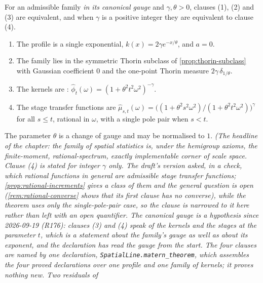 \begin{theorem}[the \Matern{} theorem]
For an admissible family \emph{in its canonical gauge} and $\gamma, \theta > 0$, clauses (1), (2)
and (3) are equivalent, and
when $\gamma$ is a positive integer they are equivalent to clause (4).
\begin{enumerate}
\item The profile is a single exponential, $k(x) = 2\gamma e^{-x/\theta}$, and $a = 0$.
\item The family lies in the symmetric Thorin subclass of \ref{prop:thorin-subclass} with
Gaussian coefficient $0$ and the one-point Thorin measure $2\gamma\,\delta_{1/\theta}$.
\item The kernels are \Matern{}: $\hat\phi_t(\omega) = (1 + \theta^2t^2\omega^2)^{-\gamma}$.
\item The stage transfer functions are $\hat\mu_{s,t}(\omega) =
\bigl((1 + \theta^2s^2\omega^2)/(1 + \theta^2t^2\omega^2)\bigr)^{\gamma}$ for all $s \le t$,
rational in $\omega$, with a single pole pair when $s < t$.
\end{enumerate}
The parameter $\theta$ is a change of gauge and may be normalised to $1$.
\statusT\quad\emph{(The headline of the chapter: the family of spatial statistics is, under the
hemigroup axioms, the finite-moment, rational-spectrum, exactly implementable corner of scale
space. Clause (4) is stated for integer $\gamma$ only. The draft's version asked, in a check,
which rational functions in general are admissible stage transfer functions;
\ref{prop:rational-increments} gives a class of them and the general question is open
(\ref{rem:rational-converse} shows that its first clause has no converse), while the theorem uses
only the single-pole-pair case, so the
clause is narrowed to it here rather than left with an open quantifier. \emph{The canonical gauge}
is a hypothesis since 2026-09-19 (R176): clauses (3) and (4) speak of the kernels and the stages
at the parameter $t$, which is a statement about the family's gauge as well as about its exponent,
and the declaration has read the gauge from the start. The four clauses are named
by one declaration, \texttt{SpatialLine.matern\_theorem}, which assembles the four proved
declarations over one profile and one family of kernels; it proves nothing new. Two residuals of
}
\end{theorem}
